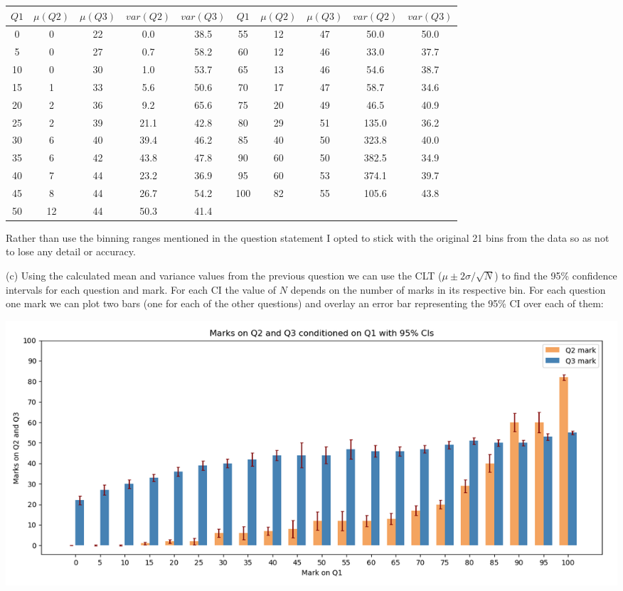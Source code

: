 \documentclass[10pt]{article}
\begin{document}
\begin{center}
    \begin{tabular}{|c|cccc|c|cccc|}
        \hline
        $Q1$ & $\mu(Q2)$ & $\mu(Q3)$ & $var(Q2)$ & $var(Q3)$ & $Q1$ & $\mu(Q2)$ & $\mu(Q3)$ & $var(Q2)$ & $var(Q3)$ \\
        \hline
         0 & 0 & 22 & 0.0 & 38.5 & 55 & 12 & 47 & 50.0 & 50.0 \\
         5 & 0 & 27 & 0.7 & 58.2 & 60 & 12 & 46 & 33.0 & 37.7 \\
         10 & 0 & 30 & 1.0 & 53.7 & 65 & 13 & 46 & 54.6 & 38.7 \\
         15 & 1 & 33 & 5.6 & 50.6 & 70 & 17 & 47 & 58.7 & 34.6 \\
         20 & 2 & 36 & 9.2 & 65.6 & 75 & 20 & 49 & 46.5 & 40.9 \\
         25 & 2 & 39 & 21.1 & 42.8 & 80 & 29 & 51 & 135.0 & 36.2 \\
         30 & 6 & 40 & 39.4 & 46.2 & 85 & 40 & 50 & 323.8 & 40.0 \\
         35 & 6 & 42 & 43.8 & 47.8 & 90 & 60 & 50 & 382.5 & 34.9 \\
         40 & 7 & 44 & 23.2 & 36.9 & 95 & 60 & 53 & 374.1 & 39.7 \\ 
         45 & 8 & 44 & 26.7 & 54.2 & 100 & 82 & 55 & 105.6 & 43.8 \\
         50 & 12 & 44 & 50.3 & 41.4 & & & & & \\
         \hline
    \end{tabular}
\end{center}

Rather than use the binning ranges mentioned in the question statement I opted to stick with the original 21 bins from the data so as not to lose any detail or accuracy.

\noindent (c) Using the calculated mean and variance values from the previous question we can use the CLT ($\mu \pm 2\sigma/\sqrt{N}$) to find the 95\% confidence intervals for each question and mark. For each CI the value of $N$ depends on the number of marks in its respective bin. For each question one mark we can plot two bars (one for each of the other questions) and overlay an error bar representing the 95\% CI over each of them:

\begin{center}
    \includegraphics[scale=0.7]{q2_c.png}
\end{center}
\end{document}
